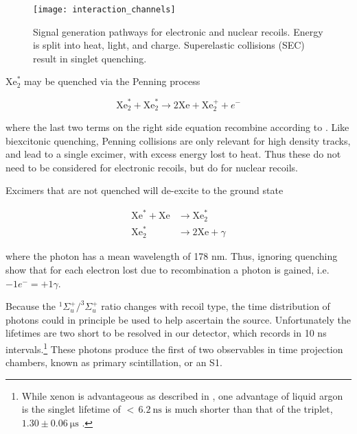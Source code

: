 \begin{figure}
\centering
\texttt{[image: interaction\_channels]}
\caption[Signal generation pathways for electronic and nuclear recoils.]{Signal generation pathways for electronic and nuclear
recoils.  Energy is split into heat, light, and charge.  Superelastic collisions (SEC) result in singlet quenching.}
\label{fig:interaction_channels}
\end{figure}

$\mathrm{Xe}_2^*$ may be quenched via the Penning process

\begin{equation}
\mathrm{Xe}_2^* + \mathrm{Xe}_2^* \rightarrow 2\mathrm{Xe} + \mathrm{Xe}_2^+ + e^-
\end{equation}

\noindent where the last two terms on the right side equation recombine according to .  Like biexcitonic
quenching, Penning collisions are only relevant for high density tracks, and lead to a single excimer, with excess energy lost to heat.  Thus
these do not need to be considered for electronic recoils, but do for nuclear recoils.

Excimers that are not quenched will de-excite to the ground state

\vspace{-25pt}

\begin{subequations}
\begin{align}
\mathrm{Xe}^{*} + \mathrm{Xe} &\rightarrow \mathrm{Xe}_{2}^{*} \\
\mathrm{Xe}_{2}^{*} &\rightarrow 2\mathrm{Xe} + \gamma \label{eq:deexcite_gamma}
\end{align}
\label{eq:deexcite}
\end{subequations}

\vspace{-25pt}

\noindent where the photon has a mean wavelength of 178 nm.  Thus, ignoring quenching  show that for each
electron lost due to recombination a photon is gained, i.e. $-1e^- = +1\gamma$.

Because the $^1\Sigma_u^+ / ^3\Sigma_u^+$ ratio changes with recoil type, the
time distribution of photons could in principle be used to help ascertain the source.  Unfortunately the lifetimes are two short to be
resolved in our detector, which records in 10 ns intervals.\footnote{While xenon is advantageous as described in , one
advantage of liquid argon is the singlet lifetime of ${<}\, 6.2\ \mathrm{ns}$ is much shorter than that of the triplet,
$1.30 \pm 0.06\ \mathrm{\mu s}$ .}  These photons produce the first of two observables in time projection chambers,
known as primary scintillation, or an S1.

